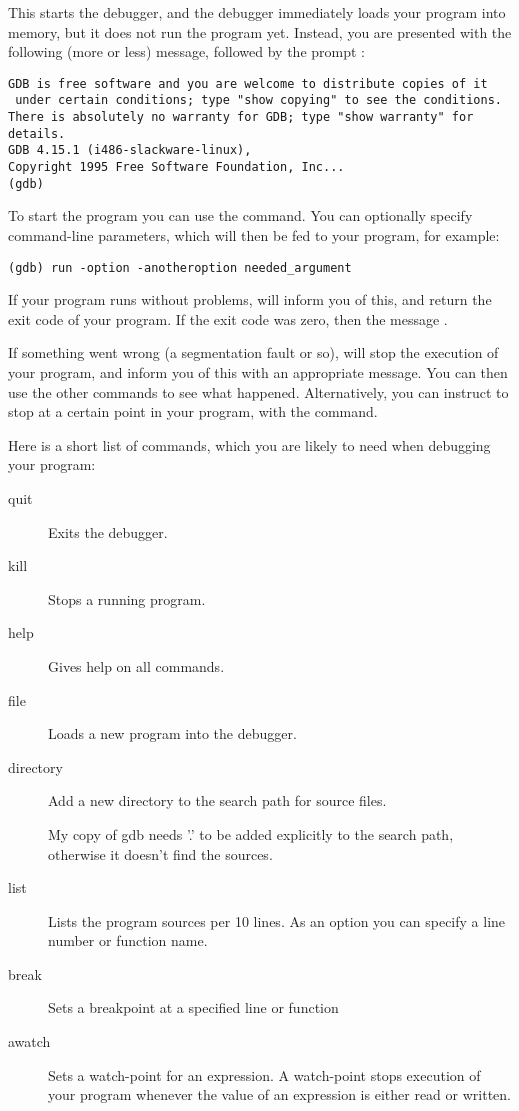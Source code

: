 \documentclass{book}
\begin{document}
This starts the debugger, and the debugger immediately loads your program
into memory, but it does not run the program yet. Instead, you are presented
with the following (more or less) message, followed by the  prompt
:
\begin{verbatim}
GDB is free software and you are welcome to distribute copies of it
 under certain conditions; type "show copying" to see the conditions.
There is absolutely no warranty for GDB; type "show warranty" for details.
GDB 4.15.1 (i486-slackware-linux),
Copyright 1995 Free Software Foundation, Inc...
(gdb)
\end{verbatim}
To start the program you can use the  command. You can optionally
specify command-line parameters, which will then be fed to your program, for
example:
\begin{verbatim}
(gdb) run -option -anotheroption needed_argument
\end{verbatim}
If your program runs without problems,  will inform you of this,
and return the exit code of your program. If the exit code was zero, then
the message .

If something went wrong (a segmentation fault or so),  will stop
the execution of your program, and inform you of this with an appropriate
message. You can then use the other  commands to see what happened.
Alternatively, you can instruct  to stop at a certain point in your
program, with the  command.

Here is a short list of  commands, which you are likely to need when
debugging your program:
\begin{description}
\item [quit\ ] Exits the debugger.
\item [kill\ ] Stops a running program.
\item [help\ ] Gives help on all  commands.
\item [file\ ] Loads a new program into the debugger.
\item [directory\ ] Add a new directory to the search path for source
files.\\
\begin{remark} My copy of gdb needs '.' to be added explicitly to the search
path, otherwise it doesn't find the sources.
\end{remark}
\item [list\ ] Lists the program sources per 10 lines. As an option you can
specify a line number or function name.
\item [break\ ] Sets a breakpoint at a specified line or function
\item [awatch\ ] Sets a watch-point for an expression. A watch-point stops
execution of your program whenever the value of an expression is either
read or written.
\end{description}
\end{document}
